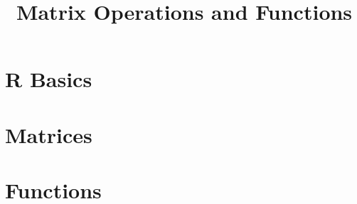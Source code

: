 

\title{Matrix Operations and Functions}

\date[]{}



\frame{\titlepage}

\frame{\tableofcontents}

\section{R Basics}
\frame{\tableofcontents[currentsection]}


\section{Matrices}
\frame{\tableofcontents[currentsection]}



\section{Functions}
\frame{\tableofcontents[currentsection]}






\appendix
\frame{}


